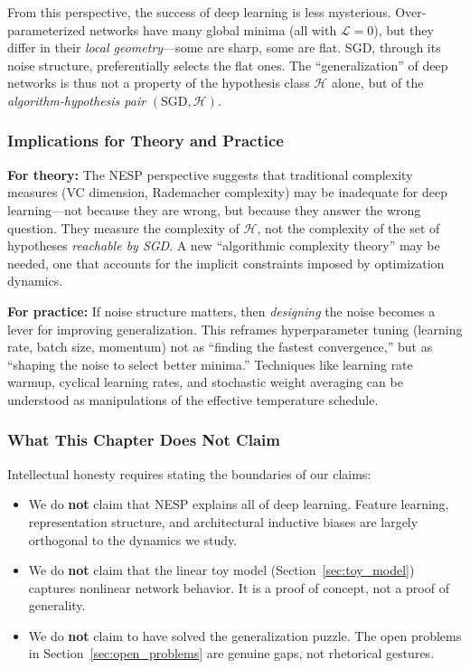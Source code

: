 \documentclass[
  journal=largetwo,
  simfonts=false,
  year=2025,
  volume=37,
]{cup-journal}
\begin{document}
From this perspective, the success of deep learning is less mysterious. Over-parameterized networks have many global minima (all with $\mathcal{L} = 0$), but they differ in their \textit{local geometry}---some are sharp, some are flat. SGD, through its noise structure, preferentially selects the flat ones. The ``generalization'' of deep networks is thus not a property of the hypothesis class $\mathcal{H}$ alone, but of the \textit{algorithm-hypothesis pair} $(\text{SGD}, \mathcal{H})$.

\subsubsection{Implications for Theory and Practice}

\textbf{For theory:} The NESP perspective suggests that traditional complexity measures (VC dimension, Rademacher complexity) may be inadequate for deep learning---not because they are wrong, but because they answer the wrong question. They measure the complexity of $\mathcal{H}$, not the complexity of the set of hypotheses \textit{reachable by SGD}. A new ``algorithmic complexity theory'' may be needed, one that accounts for the implicit constraints imposed by optimization dynamics.

\textbf{For practice:} If noise structure matters, then \textit{designing} the noise becomes a lever for improving generalization. This reframes hyperparameter tuning (learning rate, batch size, momentum) not as ``finding the fastest convergence,'' but as ``shaping the noise to select better minima.'' Techniques like learning rate warmup, cyclical learning rates, and stochastic weight averaging can be understood as manipulations of the effective temperature schedule.

\subsubsection{What This Chapter Does Not Claim}

Intellectual honesty requires stating the boundaries of our claims:
\begin{itemize}
    \item We do \textbf{not} claim that NESP explains all of deep learning. Feature learning, representation structure, and architectural inductive biases are largely orthogonal to the dynamics we study.
    \item We do \textbf{not} claim that the linear toy model (Section~\ref{sec:toy_model}) captures nonlinear network behavior. It is a proof of concept, not a proof of generality.
    \item We do \textbf{not} claim to have solved the generalization puzzle. The open problems in Section~\ref{sec:open_problems} are genuine gaps, not rhetorical gestures.
\end{itemize}
\end{document}
